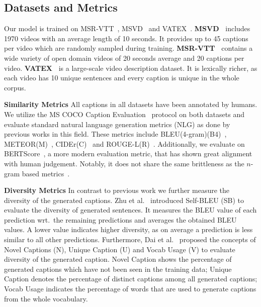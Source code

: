 \documentclass[runningheads,table]{llncs}
\begin{document}
\subsection{Datasets and Metrics}
Our model is trained on MSR-VTT~\cite{xu2016msr}, MSVD~\cite{chen2011collecting} and VATEX~\cite{wang2019vatex}.
\textbf{MSVD~\cite{chen2011collecting}} includes 1970 videos with an average length of 10 seconds. It provides up to 45 captions per video which are randomly sampled during training.  
\textbf{MSR-VTT~\cite{xu2016msr}}
contains a wide variety of open domain videos of 20 seconds average and 20 captions per video. 
\textbf{VATEX~\cite{wang2019vatex}}
is a large-scale video description dataset.
It is lexically richer, as each video has 10 unique sentences and every caption is unique in the whole corpus.



\noindent \textbf{Similarity Metrics} All captions in all datasets have been annotated by humans. We utilize the MS COCO Caption Evaluation~\cite{chen2015microsoft} protocol on both datasets and evaluate standard natural language generation metrics (NLG) as done by previous works in this field. These metrics include BLEU(4-gram)(B4)~\cite{papineni2002bleu}, METEOR(M)~\cite{banerjee2005meteor}, CIDEr(C)~\cite{vedantam2015cider} and ROUGE-L(R)~\cite{lin2004rouge}.
Additionally, we evaluate on BERTScore~\cite{bert-score}, a more modern evaluation metric, that has shown great alignment with human judgement. Notably, it does not share the same brittleness as the $n$-gram based metrics~\cite{papineni2002bleu}.



\noindent \textbf{Diversity Metrics} In contrast to previous work we further measure the diversity of the generated captions.
Zhu et al.\ \cite{zhu2018texygen} introduced Self-BLEU (SB) to evaluate the diversity of generated sentences.
It measures the BLEU value of each prediction wrt.\ the remaining predictions and averages the obtained BLEU values.
A lower value indicates higher diversity, as on average a prediction is less similar to all other predictions.
Furthermore, Dai et al.\ \cite{dai2018neural} proposed the concepts of Novel Captions (N), Unique Caption (U) and Vocab Usage (V) to evaluate diversity of the generated caption.
Novel Caption shows the percentage of generated captions which have not been seen in the training data;
Unique Caption denotes the percentage of distinct captions among all generated captions;
Vocab Usage indicates the percentage of words that are used to generate captions from the whole vocabulary.
\end{document}
